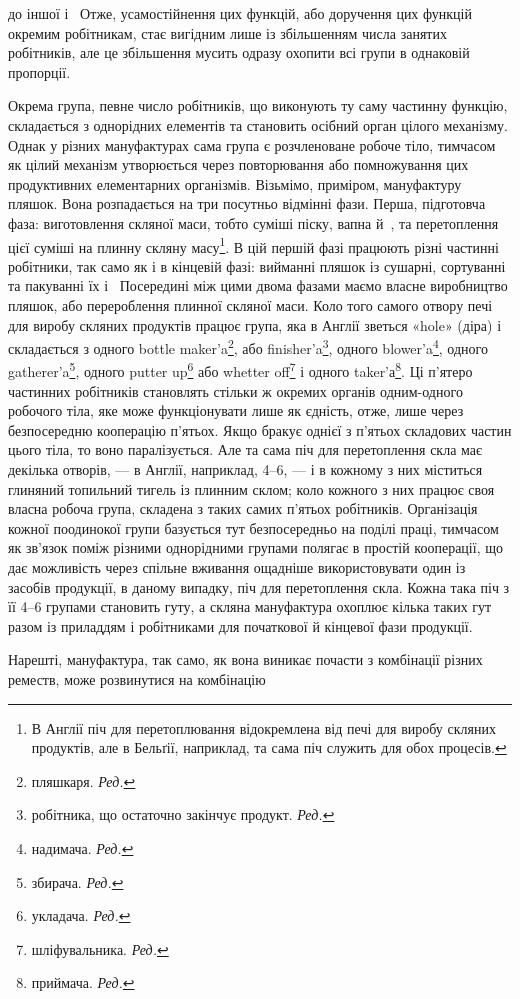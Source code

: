 \parcont{}  %
до іншої і~ Отже, усамостійнення цих функцій, або доручення
цих функцій окремим робітникам, стає вигідним лише із збільшенням
числа занятих робітників, але це збільшення мусить
одразу охопити всі групи в однаковій пропорції.

Окрема група, певне число робітників, що виконують ту саму
частинну функцію, складається з однорідних елементів та становить
осібний орган цілого механізму. Однак у різних мануфактурах
сама група є розчленоване робоче тіло, тимчасом як цілий
механізм утворюється через повторювання або помножування
цих продуктивних елементарних організмів. Візьмімо, приміром,
мануфактуру пляшок. Вона розпадається на три посутньо відмінні
фази. Перша, підготовча фаза: виготовлення скляної маси,
тобто суміші піску, вапна й~, та перетоплення цієї суміші
на плинну скляну масу\footnote{
В Англії піч для перетоплювання відокремлена від печі для виробу
скляних продуктів, але в Бельґії, наприклад, та сама піч служить
для обох процесів.
}. В цій першій фазі працюють різні
частинні робітники, так само як і в кінцевій фазі: вийманні
пляшок із сушарні, сортуванні та пакуванні їх і~ Посередині
між цими двома фазами маємо власне виробництво пляшок, або
перероблення плинної скляної маси. Коло того самого отвору
печі для виробу скляних продуктів працює група, яка в Англії
зветься «hole» (діра) і складається з одного bottle maker’a\footnote*{
пляшкаря. \emph{Ред.}
},
або finisher’a\footnote*{
робітника, що остаточно закінчує продукт. \emph{Ред.}
}, одного blower’a\footnote*{
надимача. \emph{Ред.}
}, одного gatherer’a\footnote*{
збирача. \emph{Ред.}
}, одного
putter up\footnote*{
укладача. \emph{Ред.}
} або whetter off\footnote*{
шліфувальника. \emph{Ред.}
} і одного taker’а\footnote*{
приймача. \emph{Ред.}
}.
Ці п’ятеро частинних робітників становлять стільки ж окремих
органів одним-одного робочого тіла, яке може функціонувати лише
як єдність, отже, лише через безпосередню кооперацію п’ятьох.
Якщо бракує однієї з п’ятьох складових частин цього тіла, то
воно паралізується. Але та сама піч для перетоплення скла має декілька
отворів, — в Англії, наприклад, 4--6, — і в кожному з них
міститься глиняний топильний тигель із плинним склом; коло кожного
з них працює своя власна робоча група, складена з таких самих
п’ятьох робітників. Організація кожної поодинокої групи базується
тут безпосередньо на поділі праці, тимчасом як зв’язок поміж
різними однорідними групами полягає в простій кооперації,
що дає можливість через спільне вживання ощадніше використовувати
один із засобів продукції, в даному випадку, піч для перетоплення
скла. Кожна така піч з її 4--6 групами становить гуту,
а скляна мануфактура охоплює кілька таких гут разом із приладдям
і робітниками для початкової й кінцевої фази продукції.

Нарешті, мануфактура, так само, як вона виникає почасти
з комбінації різних реместв, може розвинутися на комбінацію
\parbreak{}  %
